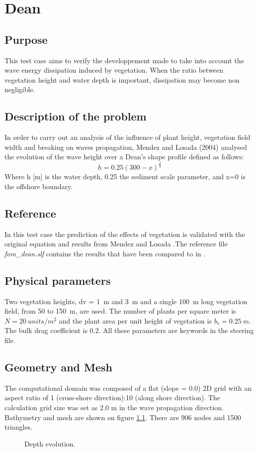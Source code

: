 \chapter{Dean}
%

%
\section{Purpose}
%
This test case aims to verify the developpement made to take into account the
wave energy dissipation induced by vegetation. When the ratio between
vegetation height and water depth is important, dissipation may become non
negligible.
%
\section{Description of the problem}
%
In order to carry out an analysis of the influence of plant height, vegetation
field width and breaking on waves propagation, Mendez and Losada (2004)
analysed the evolution of the wave height over a Dean’s shape profile
\cite{Dean1991} defined as follows:
$$
h=0.25(300-x)^\frac{2}{3}
$$
Where h [m] is the water depth, 0.25 the sediment scale parameter, and x=0 is
the offshore boundary.

\section{Reference}
%
In this test case the prediction of the effects of vegetation is validated
with the original equation and results from Mendez and Losada
\cite{Mendez2004}.The reference file {\it fom\_dean.slf} contains the results
that have been compared to \cite{Mendez2004} in \cite{Bacchi2014}.

\section{Physical parameters}
%
Two vegetation heights, dv = 1~m and 3~m and a single 100~m long vegetation
field, from 50 to 150~m, are used. The number of plants per square meter is
$N = 20~units/m^2$ and the plant area per unit height of vegetation is
$b_v = 0.25~m.$ The bulk drag coefficient is 0.2. All these parameters are
keywords in the steering file.


\section{Geometry and Mesh}
%
The computational domain was composed of a flat (slope = 0.0) 2D grid with an
aspect ratio of 1 (cross-shore direction):10 (along shore direction). The
calculation grid size was set as 2.0 m in the wave propagation direction.
Bathymetry and mesh are shown on figure \ref{bathydean}. There are 906 nodes
and 1500 triangles.
\begin{figure} [!h]
\centering
{}
 \caption{Depth evolution.}
\label{bathydean}
\end{figure}

